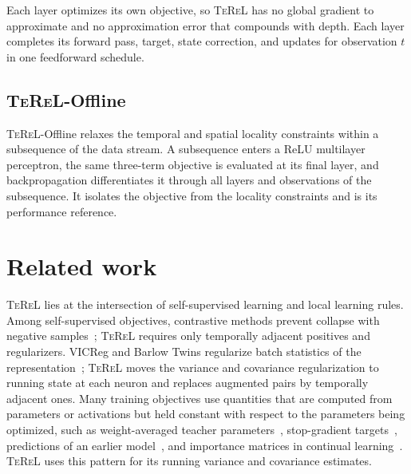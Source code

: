 \documentclass[11pt]{article}
\newcommand{\TeReL}{\textsc{TeReL}}
\newcommand{\TeReLOffline}{\TeReL{}-Offline}
\begin{document}
Each layer optimizes its own objective, so \TeReL{} has no global gradient
to approximate and no approximation error that compounds with depth. Each
layer completes its forward pass, target, state correction, and updates for
observation $t$ in one feedforward schedule.

\subsection{\TeReLOffline{}}

\TeReLOffline{} relaxes the temporal and spatial locality constraints within a
subsequence of the data stream. A subsequence enters a ReLU multilayer
perceptron, the same three-term objective is evaluated at its final layer, and
backpropagation differentiates it through all layers and observations of the
subsequence. It isolates the objective from the locality constraints and
is its performance reference.

\section{Related work}
\label{sec:related}

\TeReL{} lies at the intersection of self-supervised learning and local
learning rules. Among self-supervised objectives, contrastive methods prevent
collapse with negative samples~\cite{chen2020,oord2018}; \TeReL{}
requires only temporally adjacent positives and regularizers. VICReg and
Barlow Twins regularize batch statistics of the
representation~\cite{bardes2022,zbontar2021}; \TeReL{} moves the variance and
covariance regularization to running state at each neuron and replaces
augmented pairs by temporally adjacent ones. Many training objectives use
quantities that are computed from parameters or activations but held constant
with respect to the parameters being optimized, such as weight-averaged
teacher parameters~\cite{tarvainen2017}, stop-gradient
targets~\cite{grill2020,chenhe2021}, predictions of an earlier
model~\cite{li2016}, and importance matrices in continual
learning~\cite{kirkpatrick2017,wiest2026iewc}. \TeReL{} uses this pattern for
its running variance and covariance estimates.
\end{document}
